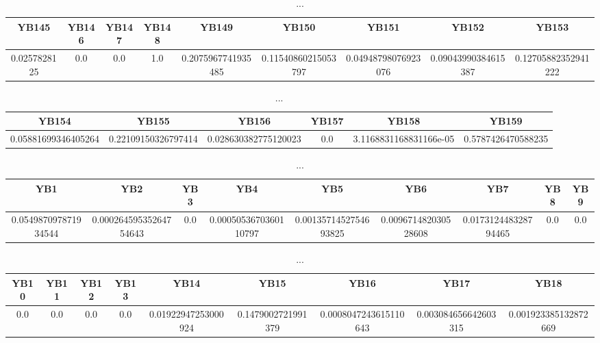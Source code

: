 \documentclass[]{article}
\begin{document}
\begin{table}[h]
      \centering
      \begin{tabular}{|c|c|c|c|c|c|c|c|c|}
            \hline
            YB145        & YB146 & YB147 & YB148 & YB149              & YB150               & YB151               & YB152               & YB153               \\
            \hline
            0.0257828125 & 0.0   & 0.0   & 1.0   & 0.2075967741935485 & 0.11540860215053797 & 0.04948798076923076 & 0.09043990384615387 & 0.12705882352941222 \\
            \hline
      \end{tabular}
      \caption{...}
\end{table}
\begin{table}[h]
      \centering
      \begin{tabular}{|c|c|c|c|c|c|}
            \hline
            YB154               & YB155               & YB156                & YB157 & YB158                  & YB159              \\
            \hline
            0.05881699346405264 & 0.22109150326797414 & 0.028630382775120023 & 0.0   & 3.1168831168831166e-05 & 0.5787426470588235 \\
            \hline
      \end{tabular}
      \caption{...}
\end{table}
\begin{table}[h]
      \centering
      \begin{tabular}{|c|c|c|c|c|c|c|c|c|}
            \hline
            YB1                  & YB2                    & YB3 & YB4                   & YB5                   & YB6                  & YB7                  & YB8 & YB9 \\
            \hline
            0.054987097871934544 & 0.00026459535264754643 & 0.0 & 0.0005053670360110797 & 0.0013571452754693825 & 0.009671482030528608 & 0.017312448328794465 & 0.0 & 0.0 \\
            \hline
      \end{tabular}
      \caption{...}
\end{table}
\begin{table}[h]
      \centering
      \begin{tabular}{|c|c|c|c|c|c|c|c|c|}
            \hline
            YB10 & YB11 & YB12 & YB13 & YB14                & YB15               & YB16                  & YB17                 & YB18                 \\
            \hline
            0.0  & 0.0  & 0.0  & 0.0  & 0.01922947253000924 & 0.1479002721991379 & 0.0008047243615110643 & 0.003084656642603315 & 0.001923385132872669 \\
            \hline
      \end{tabular}
      \caption{...}
\end{table}
\end{document}
